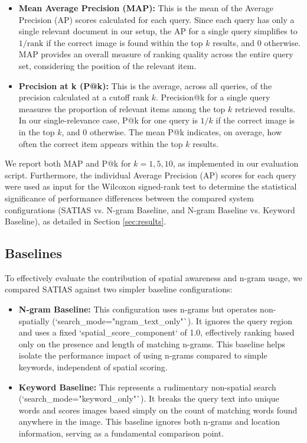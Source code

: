 \documentclass[sigconf,screen]{acmart}
\begin{document}
\begin{itemize}
    \item \textbf{Mean Average Precision (MAP):} This is the mean of the Average Precision (AP) scores calculated for each query. Since each query has only a single relevant document in our setup, the AP for a single query simplifies to $1/\text{rank}$ if the correct image is found within the top $k$ results, and 0 otherwise. MAP provides an overall measure of ranking quality across the entire query set, considering the position of the relevant item.
    \item \textbf{Precision at k (P@k):} This is the average, across all queries, of the precision calculated at a cutoff rank $k$. Precision@k for a single query measures the proportion of relevant items among the top $k$ retrieved results. In our single-relevance case, P@k for one query is $1/k$ if the correct image is in the top $k$, and 0 otherwise. The mean P@k indicates, on average, how often the correct item appears within the top $k$ results.
\end{itemize}

We report both MAP and P@k for $k=1, 5, 10$, as implemented in our evaluation script. Furthermore, the individual Average Precision (AP) scores for each query were used as input for the Wilcoxon signed-rank test to determine the statistical significance of performance differences between the compared system configurations (SATIAS vs. N-gram Baseline, and N-gram Baseline vs. Keyword Baseline), as detailed in Section \ref{sec:results}.

\subsection{Baselines}
\label{sec:baselines}

To effectively evaluate the contribution of spatial awareness and n-gram usage, we compared SATIAS against two simpler baseline configurations:

\begin{itemize}
    \item \textbf{N-gram Baseline:} This configuration uses n-grams but operates non-spatially (`search\_mode="ngram\_text\_only"`). It ignores the query region and uses a fixed `spatial\_score\_component` of 1.0, effectively ranking based only on the presence and length of matching n-grams. This baseline helps isolate the performance impact of using n-grams compared to simple keywords, independent of spatial scoring.
    \item \textbf{Keyword Baseline:} This represents a rudimentary non-spatial search (`search\_mode="keyword\_only"`). It breaks the query text into unique words and scores images based simply on the count of matching words found anywhere in the image. This baseline ignores both n-grams and location information, serving as a fundamental comparison point.
\end{itemize}
\end{document}
